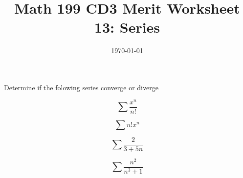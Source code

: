 

\usepackage{fullpage,amsmath,amssymb,amsthm}

\newcommand{\D}{\displaystyle}

\title{Math 199 CD3 Merit Worksheet 13: Series}
\date{\today}




\maketitle
Determine if the folowing series converge or diverge
\be
	\item 
	$$\sum \frac{x^n}{n!}$$
	\vfill
	\item
	$$\sum n!x^n$$
	\vfill 
	\item 
	$$\sum \frac{2}{3+5n}$$
	\vfill

	\item
	$$\sum \frac{n^2}{n^3+1}$$
\vfill

\ee

